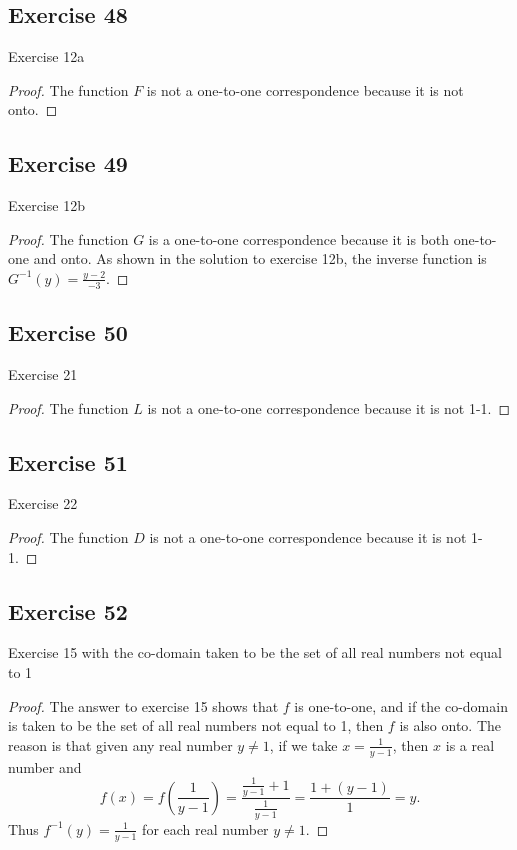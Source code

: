 \documentclass[14pt]{extarticle}
\begin{document}
\subsection{Exercise 48}
Exercise 12a
\begin{proof}
The function $F$ is not a one-to-one correspondence because it is not onto.
\end{proof}

\subsection{Exercise 49}
Exercise 12b
\begin{proof}
The function $G$ is a one-to-one correspondence because it is both one-to-one and onto. As shown in the solution to
exercise 12b, the inverse function is \(G^{-1}(y) = \frac{y-2}{-3}\).
\end{proof}

\subsection{Exercise 50}
Exercise 21
\begin{proof}
The function $L$ is not a one-to-one correspondence because it is not 1-1.
\end{proof}

\subsection{Exercise 51}
Exercise 22
\begin{proof}
The function $D$ is not a one-to-one correspondence because it is not 1-1.
\end{proof}

\subsection{Exercise 52}
Exercise 15 with the co-domain taken to be the set of all real numbers not equal to 1

\begin{proof}
The answer to exercise 15 shows that $f$ is one-to-one, and if the co-domain is taken to be the set of all real numbers 
not equal to 1, then $f$ is also onto. The reason is that given any real number \(y \neq 1\), if we take 
\(x = \frac{1}{y-1}\), then $x$ is a real number and
\[
f(x) = f\left(\frac{1}{y-1}\right) = \frac{\frac{1}{y-1} + 1}{\frac{1}{y-1}} = \frac{1+(y-1)}{1} = y.
\]
Thus \(f^{-1}(y) = \frac{1}{y-1}\) for each real number \(y \neq 1\).
\end{proof}
\end{document}
